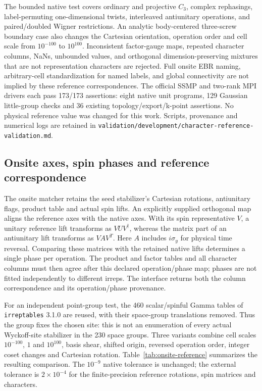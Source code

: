 \documentclass[11pt]{article}
\begin{document}
The bounded native test covers ordinary and projective $C_3$, complex
rephasings, label-permuting one-dimensional twists, interleaved
antiunitary operations, and paired/doubled Wigner restrictions. An
analytic body-centered three-screw boundary case also changes the
Cartesian orientation, operation order and cell scale from $10^{-100}$
to $10^{100}$. Inconsistent factor-gauge maps, repeated character columns, NaNs,
unbounded values, and orthogonal dimension-preserving mixtures that
are not representation characters are rejected. Full onsite EBR
naming, arbitrary-cell standardization for named labels, and global
connectivity are not implied by these reference correspondences.
The official SSMP and two-rank MPI drivers each pass 173/173 assertions:
eight native unit programs, 129 Gaussian little-group checks and 36
existing topology/export/k-point assertions. No physical reference
value was changed for this work.
Scripts, provenance and numerical logs are retained in
\texttt{validation/development/character-reference-validation.md}.

\subsection{Onsite axes, spin phases and reference correspondence}
\label{sec:si-onsite-reference}
The onsite matcher retains the seed stabilizer's Cartesian rotations,
antiunitary flags, product table and actual spin lifts. An explicitly
supplied orthogonal map aligns the reference axes with the native
axes. With its spin representative $V$, a unitary reference lift
transforms as $VUV^\dagger$, whereas the matrix part of an antiunitary
lift transforms as $VAV^T$. Here $A$ includes $i\sigma_y$ for physical
time reversal. Comparing these matrices with the retained native
lifts determines a single phase per operation. The product and
factor tables and all character columns must then agree after this
declared operation/phase map; phases are not fitted independently
to different irreps. The interface returns both the column
correspondence and its operation/phase provenance.

For an independent point-group test, the 460 scalar/spinful Gamma
tables of \texttt{irreptables} 3.1.0 are reused, with their space-group
translations removed. Thus the group fixes the chosen site: this is
not an enumeration of every actual Wyckoff-site stabilizer in the
230 space groups. Three variants combine cell scales $10^{-100}$,
$1$ and $10^{100}$, basis shear, shifted origin, reversed operation
order, integer coset changes and Cartesian rotation.
Table~\ref{tab:onsite-reference} summarizes the resulting comparison.
The $10^{-9}$ native tolerance is unchanged; the external tolerance
is $2\times10^{-4}$ for the finite-precision reference rotations,
spin matrices and characters.
\end{document}
